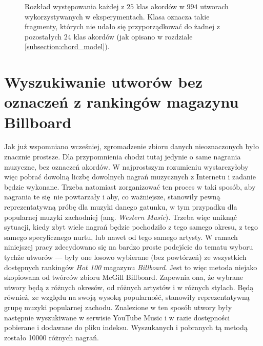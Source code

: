 \begin{figure}
    \centering
    \caption{Rozkład występowania każdej z $25$ klas akordów w $994$ utworach wykorzystywanych w eksperymentach. Klasa  oznacza takie fragmenty, których nie udało się przyporządkować do żadnej z pozostałych $24$ klas akordów (jak opisano w rozdziale \ref{subsection:chord_model}).}
    \label{fig:chords_histogram}
\end{figure}


\section{Wyszukiwanie utworów bez oznaczeń z rankingów magazynu Billboard}

Jak już wspomniano wcześniej, zgromadzenie zbioru danych nieoznaczonych było znacznie prostsze. Dla przypomnienia chodzi tutaj jedynie o same nagrania muzyczne, bez oznaczeń akordów. W najprostszym rozumieniu wystarczyłoby więc pobrać dowolną liczbę dowolnych nagrań muzycznych z Internetu i zadanie będzie wykonane. Trzeba natomiast zorganizować ten proces w taki sposób, aby nagrania te się nie powtarzały i aby, co ważniejsze, stanowiły pewną reprezentatywną próbę dla muzyki danego gatunku, w tym przypadku dla popularnej muzyki zachodniej (ang. \emph{Western Music}). Trzeba więc uniknąć sytuacji, kiedy zbyt wiele nagrań będzie pochodziło z tego samego okresu, z tego samego specyficznego nurtu, lub nawet od tego samego artysty. W ramach niniejszej pracy zdecydowano się na bardzo proste podejście do tematu wyboru tychże utworów --- były one losowo wybierane (bez powtórzeń) ze wszystkich dostępnych rankingów \emph{Hot 100} magazynu \emph{Billboard}. Jest to więc metoda niejako skopiowana od twórców zbioru McGill Billboard. Zapewnia ona, że wybrane utwory będą z różnych okresów, od różnych artystów i w różnych stylach. Będą również, ze względu na swoją wysoką popularność, stanowiły reprezentatywną grupę muzyki popularnej zachodu. Znalezione w ten sposób utwory były następnie wyszukiwane w serwisie YouTube Music i w razie dostępności pobierane i dodawane do pliku indeksu. Wyszukanych i pobranych tą metodą zostało 10000 różnych nagrań.

